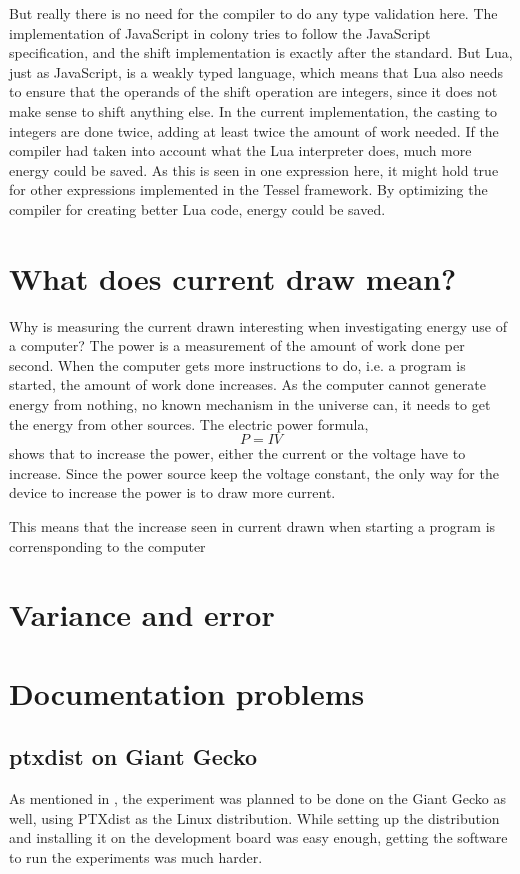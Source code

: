 But really there is no need for the compiler to do any type validation here.
The implementation of JavaScript in colony tries to follow the JavaScript specification, and the shift implementation is exactly after the standard.
But Lua, just as JavaScript, is a weakly typed language, which means that Lua also needs to ensure that the operands of the shift operation are integers, since it does not make sense to shift anything else.
In the current implementation, the casting to integers are done twice, adding at least twice the amount of work needed.
If the compiler had taken into account what the Lua interpreter does, much more energy could be saved.
As this is seen in one expression here, it might hold true for other expressions implemented in the Tessel framework.
By optimizing the compiler for creating better Lua code, energy could be saved.


\section{What does current draw mean?}
Why is measuring the current drawn interesting when investigating energy use of a computer?
The power is a measurement of the amount of work done per second.
When the computer gets more instructions to do, i.e. a program is started, the amount of work done increases.
As the computer cannot generate energy from nothing, no known mechanism in the universe can, it needs to get the energy from other sources.
The electric power formula,
\[P = IV\]
shows that to increase the power, either the current or the voltage have to increase.
Since the power source keep the voltage constant, the only way for the device to increase the power is to draw more current.

This means that the increase seen in current drawn when starting a program is corrensponding to the computer 

\section{Variance and error}

\section{Documentation problems}

\subsection{ptxdist on Giant Gecko}
As mentioned in , the experiment was planned to be done on the Giant Gecko as well, using PTXdist as the Linux distribution.
While setting up the distribution and installing it on the development board was easy enough, getting the software to run the experiments was much harder.

